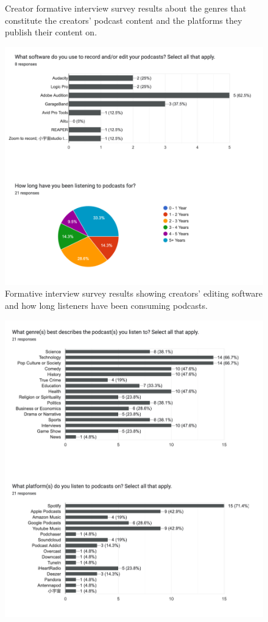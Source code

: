 \documentclass[12pt]{report}
\begin{document}
\begin{myfont}
\begin{figure}[H]
          \caption{Creator formative interview survey results about the genres that constitute the creators' podcast content and the platforms they publish their content on.}
        \end{figure}
        \begin{figure}[H]
        \centering
          \includegraphics[width=1\textwidth]{figures/formative4.png}
          \caption{Formative interview survey results showing creators' editing software and how long listeners have been consuming podcasts.}
        \end{figure}
        \begin{figure}[H]
        \centering
          \includegraphics[width=1\textwidth]{figures/formative5.png}

\end{figure}
\end{myfont}
\end{document}
